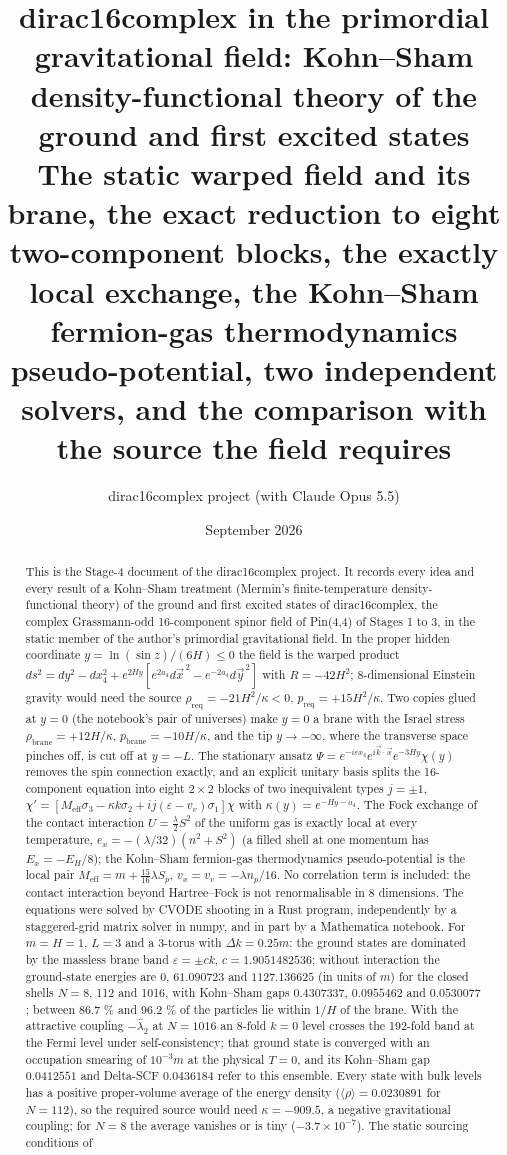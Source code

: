 \documentclass[11pt]{article}
\title{dirac16complex in the primordial gravitational field: Kohn--Sham density-functional theory of the ground and first excited states\\[0.5em]\large The static warped field and its brane, the exact reduction to eight two-component blocks, the exactly local exchange, the Kohn--Sham fermion-gas thermodynamics pseudo-potential, two independent solvers, and the comparison with the source the field requires}
\author{dirac16complex project (with Claude Opus 5.5)}
\date{September 2026}
\begin{document}
\maketitle
\tableofcontents
\newpage
\begin{abstract}
This is the Stage-4 document of the dirac16complex project. It records every idea and every result of a Kohn--Sham treatment (Mermin's finite-temperature density-functional theory) of the ground and first excited states of dirac16complex, the complex Grassmann-odd 16-component spinor field of Pin(4,4) of Stages 1 to 3, in the static member of the author's primordial gravitational field. In the proper hidden coordinate $y=\ln(\sin z)/(6H)\le0$ the field is the warped product $ds^2=dy^2-dx_4^2+e^{2Hy}[e^{2a_4}d\vec x^{\,2}-e^{-2a_4}d\vec y^{\,2}]$ with $R=-42H^2$; 8-dimensional Einstein gravity would need the source $\rho_{\mathrm{req}}=-21H^2/\kappa<0$, $p_{\mathrm{req}}=+15H^2/\kappa$. Two copies glued at $y=0$ (the notebook's pair of universes) make $y=0$ a brane with the Israel stress $\rho_{\mathrm{brane}}=+12H/\kappa$, $p_{\mathrm{brane}}=-10H/\kappa$, and the tip $y\to-\infty$, where the transverse space pinches off, is cut off at $y=-L$. The stationary ansatz $\Psi=e^{-i\varepsilon x_4}e^{i\vec k\cdot\vec x}e^{-3Hy}\chi(y)$ removes the spin connection exactly, and an explicit unitary basis splits the 16-component equation into eight $2\times2$ blocks of two inequivalent types $j=\pm1$, $\chi'=[M_{\mathrm{eff}}\sigma_3-\kappa k\sigma_2+ij(\varepsilon-v_v)\sigma_1]\chi$ with $\kappa(y)=e^{-Hy-a_4}$. The Fock exchange of the contact interaction $U=\tfrac\lambda2S^2$ of the uniform gas is exactly local at every temperature, $e_x=-(\lambda/32)(n^2+S^2)$ (a filled shell at one momentum has $E_x=-E_H/8$); the Kohn--Sham fermion-gas thermodynamics pseudo-potential is the local pair $M_{\mathrm{eff}}=m+\tfrac{15}{16}\lambda S_p$, $v_x=v_v=-\lambda n_p/16$. No correlation term is included: the contact interaction beyond Hartree--Fock is not renormalisable in 8 dimensions. The equations were solved by CVODE shooting in a Rust program, independently by a staggered-grid matrix solver in numpy, and in part by a Mathematica notebook. For $m=H=1$, $L=3$ and a 3-torus with $\Delta k=0.25m$: the ground states are dominated by the massless brane band $\varepsilon=\pm ck$, $c=1.9051482536$; without interaction the ground-state energies are $0$, $61.090723$ and $1127.136625$ (in units of $m$) for the closed shells $N=8$, 112 and 1016, with Kohn--Sham gaps $0.4307337$, $0.0955462$ and $0.0530077$; between 86.7 \% and 96.2 \% of the particles lie within $1/H$ of the brane. With the attractive coupling $-\hat\lambda_2$ at $N=1016$ an 8-fold $k=0$ level crosses the 192-fold band at the Fermi level under self-consistency; that ground state is converged with an occupation smearing of $10^{-3}m$ at the physical $T=0$, and its Kohn--Sham gap $0.0412551$ and Delta-SCF $0.0436184$ refer to this ensemble. Every state with bulk levels has a positive proper-volume average of the energy density ($\langle\rho\rangle=0.0230891$ for $N=112$), so the required source would need $\kappa=-909.5$, a negative gravitational coupling; for $N=8$ the average vanishes or is tiny ($-3.7\times10^{-7}$). The static sourcing conditions of 
\end{abstract}
\end{document}
